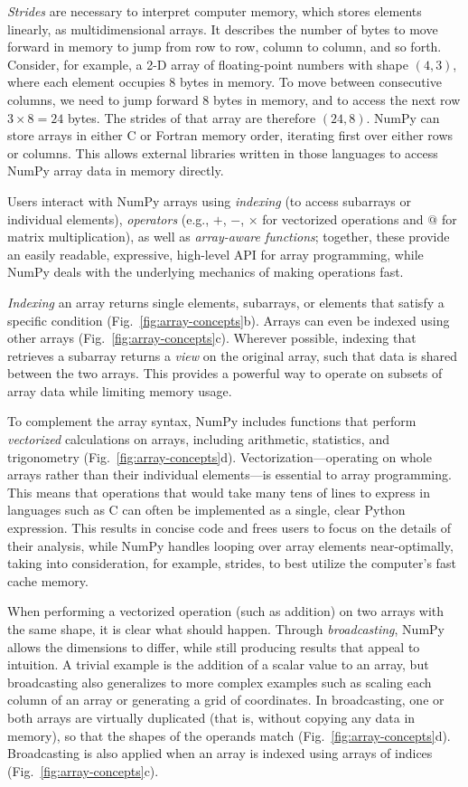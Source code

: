 \emph{Strides} are necessary to interpret computer memory, which stores elements
linearly, as multidimensional arrays.
It describes the number of bytes to move forward in memory to jump from row to
row, column to column, and so forth.
Consider, for example, a 2-D array of floating-point numbers with shape
$(4, 3)$, where each element occupies 8 bytes in memory.
To move between consecutive columns, we need to jump forward 8 bytes in memory,
and to access the next row $3 \times 8 = 24$ bytes.
The strides of that array are therefore $(24, 8)$.  NumPy can
store arrays in either C or Fortran memory order, iterating
first over either rows or columns.  This allows external libraries
written in those languages to access NumPy array data in memory directly.

Users interact with NumPy arrays using {\em indexing} (to access
subarrays or individual elements), {\em operators} (e.g., $+$, $-$, $\times$
for vectorized operations and $@$ for matrix multiplication), as well as {\em array-aware functions};
together, these provide an easily readable, expressive, high-level API for
array programming, while NumPy
deals with the underlying mechanics of making operations fast.

\emph{Indexing} an array returns single elements, subarrays, or elements that satisfy
a specific condition (Fig.~\ref{fig:array-concepts}b).
Arrays can even be indexed using other arrays (Fig.~\ref{fig:array-concepts}c).
Wherever possible, indexing that retrieves a subarray returns a {\em view} on
the original array, such that data is shared between the two arrays.
This provides a powerful way to operate on subsets of array data while
limiting memory usage.

To complement the array syntax, NumPy includes functions that perform
\emph{vectorized} calculations on arrays, including arithmetic, statistics, and
trigonometry (Fig.~\ref{fig:array-concepts}d).
Vectorization---operating on whole arrays rather than their individual
elements---is essential to array programming.
This means that operations that would take many tens of lines to express in
languages such as C can often be implemented as a single, clear Python
expression.
This results in concise code and frees users to focus on the details of
their analysis, while NumPy handles looping over array elements near-optimally,
taking into consideration, for example, strides, to best utilize the
computer's fast cache memory.

When performing a vectorized operation (such as addition) on two arrays with
the same shape, it is clear what should happen.
Through \emph{broadcasting}, NumPy allows the dimensions to differ, while
still producing results that appeal to intuition.
A trivial example is the addition of a scalar value to an array, but broadcasting also
generalizes to more complex examples such as scaling each column of an array
or generating a grid of coordinates.
In broadcasting, one or both arrays are virtually duplicated (that is, without
copying any data in memory), so that the shapes of the operands match
(Fig.~\ref{fig:array-concepts}d).
Broadcasting is also applied when an array is indexed using arrays of
indices (Fig.~\ref{fig:array-concepts}c).

